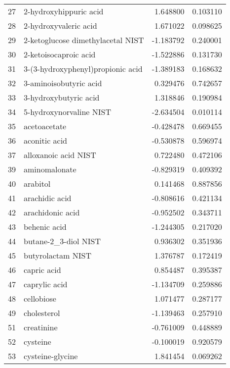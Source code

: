 \begin{tabular}{llrr}
27  &             2-hydroxyhippuric acid &  1.648800 &  0.103110 \\
28  &              2-hydroxyvaleric acid &  1.671022 &  0.098625 \\
29  &  2-ketoglucose dimethylacetal NIST & -1.183792 &  0.240001 \\
30  &              2-ketoisocaproic acid & -1.522886 &  0.131730 \\
31  &  3-(3-hydroxyphenyl)propionic acid & -1.389183 &  0.168632 \\
32  &             3-aminoisobutyric acid &  0.329476 &  0.742657 \\
33  &              3-hydroxybutyric acid &  1.318846 &  0.190984 \\
34  &            5-hydroxynorvaline NIST & -2.634504 &  0.010114 \\
35  &                       acetoacetate & -0.428478 &  0.669455 \\
36  &                      aconitic acid & -0.530878 &  0.596974 \\
37  &               alloxanoic acid NIST &  0.722480 &  0.472106 \\
39  &                      aminomalonate & -0.829319 &  0.409392 \\
40  &                           arabitol &  0.141468 &  0.887856 \\
41  &                     arachidic acid & -0.808616 &  0.421134 \\
42  &                   arachidonic acid & -0.952502 &  0.343711 \\
43  &                       behenic acid & -1.244305 &  0.217020 \\
44  &               butane-2\_3-diol NIST &  0.936302 &  0.351936 \\
45  &                  butyrolactam NIST &  1.376787 &  0.172419 \\
46  &                        capric acid &  0.854487 &  0.395387 \\
47  &                      caprylic acid & -1.134709 &  0.259886 \\
48  &                         cellobiose &  1.071477 &  0.287177 \\
49  &                        cholesterol & -1.139463 &  0.257910 \\
51  &                         creatinine & -0.761009 &  0.448889 \\
52  &                           cysteine & -0.100019 &  0.920579 \\
53  &                   cysteine-glycine &  1.841454 &  0.069262 \\

\end{tabular}
